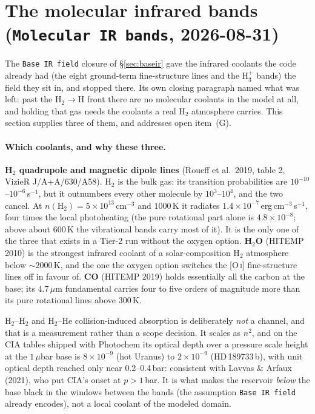 \documentclass[english,a4paper]{my_memo}
\begin{document}
\section{The molecular infrared bands (\texttt{Molecular IR bands}, 2026-08-31)}
\label{sec:molir}
The \texttt{Base IR field} closure of \S\ref{sec:baseir} gave the infrared
coolants the code already had (the eight ground-term fine-structure lines and
the H$_3^+$ bands) the field they sit in, and stopped there. Its own closing
paragraph named what was left: past the H$_2\to$H front there are no molecular
coolants in the model at all, and holding that gas needs the coolants a real
H$_2$ atmosphere carries. This section supplies three of them, and addresses
open item~(G).

\paragraph{Which coolants, and why these three.}
\textbf{H$_2$ quadrupole and magnetic dipole lines} (Roueff et al.\ 2019, table 2,
VizieR J/A+A/630/A58). H$_2$ is the bulk gas: its transition probabilities are
$10^{-10}$--$10^{-6}$\,s$^{-1}$, but it outnumbers every other molecule by
$10^{3}$--$10^{4}$, and the two cancel. At $n(\mathrm{H_2})=5\times10^{13}$\,cm$^{-3}$
and $1000$\,K it radiates $1.4\times10^{-7}$\,erg\,cm$^{-3}$\,s$^{-1}$, four times
the local photoheating (the pure rotational part alone is
$4.8\times10^{-8}$; above about 600\,K the vibrational bands carry most of it). It is the only one of the three that exists in a
Tier-2 run without the oxygen option.
\textbf{H$_2$O} (HITEMP 2010) is the strongest infrared coolant of a
solar-composition H$_2$ atmosphere below ${\sim}2000$\,K, and the one the oxygen
option switches the [O\,\textsc{i}] fine-structure lines off in favour of.
\textbf{CO} (HITEMP 2019) holds essentially all the carbon at the base; its
4.7\,$\mu$m fundamental carries four to five orders of magnitude more than
its pure rotational lines above 300\,K.

H$_2$--H$_2$ and H$_2$--He collision-induced absorption is deliberately \emph{not}
a channel, and that is a measurement rather than a scope decision. It scales as
$n^2$, and on the CIA tables shipped with Photochem its optical depth over a
pressure scale height at the $1\,\mu$bar base is $8\times10^{-9}$ (hot Uranus) to
$2\times10^{-9}$ (HD\,189733\,b), with unit optical depth reached only near
0.2--0.4\,bar: consistent with Lavvas \& Arfaux (2021), who put CIA's onset at
$p>1$\,bar. It is what makes the reservoir \emph{below} the base black in the
windows between the bands (the assumption \texttt{Base IR field} already
encodes), not a local coolant of the modeled domain.
\end{document}
